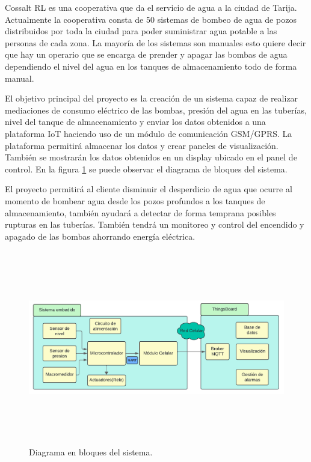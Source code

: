 \documentclass[
11pt, %
codirector, %
]{charter}
\begin{document}
Cossalt RL es una cooperativa que da el servicio de agua a la ciudad de Tarija. Actualmente la cooperativa consta de 50 sistemas de bombeo de agua de pozos distribuidos por toda la ciudad para poder suministrar agua potable a las personas de cada zona. La mayoría de los sistemas son manuales esto quiere decir que hay un operario que se encarga de prender y apagar las bombas de agua dependiendo el nivel del agua en los tanques de almacenamiento todo de forma manual.

El objetivo principal del proyecto es la creación de un sistema capaz de realizar mediaciones de consumo eléctrico de las bombas, presión del agua en las tuberías, nivel del tanque de almacenamiento y enviar los datos obtenidos a una plataforma IoT haciendo uso de un módulo de comunicación GSM/GPRS. La plataforma permitirá almacenar los datos y crear paneles de visualización. También se mostrarán los datos obtenidos en un display ubicado en el panel de control. 
En la figura \ref{fig:diagra_sistema} se puede observar el diagrama de bloques del sistema.

El proyecto permitirá al cliente disminuir el desperdicio de agua que ocurre al momento de bombear agua desde los pozos profundos a los tanques de almacenamiento, también ayudará a detectar de forma temprana posibles rupturas en las tuberías. También tendrá un monitoreo y control del encendido y apagado de las bombas ahorrando energía eléctrica.

\begin{figure}[hpb]
	\centering 
	\includegraphics[width=15cm, height=8.5cm]{./Figuras/d_sistema.png}
	\caption{Diagrama en bloques del sistema.}
	\label{fig:diagra_sistema}
\end{figure}
\vspace{2cm}
\end{document}

